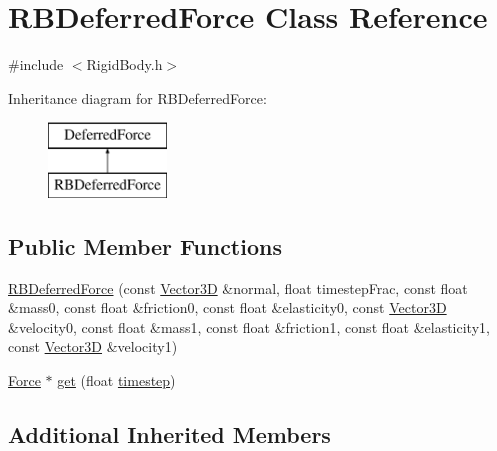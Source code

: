 \hypertarget{class_r_b_deferred_force}{\section{R\-B\-Deferred\-Force Class Reference}
\label{class_r_b_deferred_force}
}


{\ttfamily \#include $<$Rigid\-Body.\-h$>$}

Inheritance diagram for R\-B\-Deferred\-Force\-:\begin{figure}[H]
\begin{center}
\leavevmode
\includegraphics[height=2.000000cm]{class_r_b_deferred_force}
\end{center}
\end{figure}
\subsection*{Public Member Functions}
\begin{DoxyCompactItemize}
\item 
\hyperlink{class_r_b_deferred_force_a94a33b90bfbbbb35233b49fc032d3304}{R\-B\-Deferred\-Force} (const \hyperlink{class_vector3_d}{Vector3\-D} \&normal, float timestep\-Frac, const float \&mass0, const float \&friction0, const float \&elasticity0, const \hyperlink{class_vector3_d}{Vector3\-D} \&velocity0, const float \&mass1, const float \&friction1, const float \&elasticity1, const \hyperlink{class_vector3_d}{Vector3\-D} \&velocity1)
\item 
\hyperlink{class_force}{Force} $\ast$ \hyperlink{class_r_b_deferred_force_a35e7ec80d60e82e9175b06d864b0af2a}{get} (float \hyperlink{_physically_based_8h_ab9edcc09985767509bf717e25ac80ab7}{timestep})
\end{DoxyCompactItemize}
\subsection*{Additional Inherited Members}


